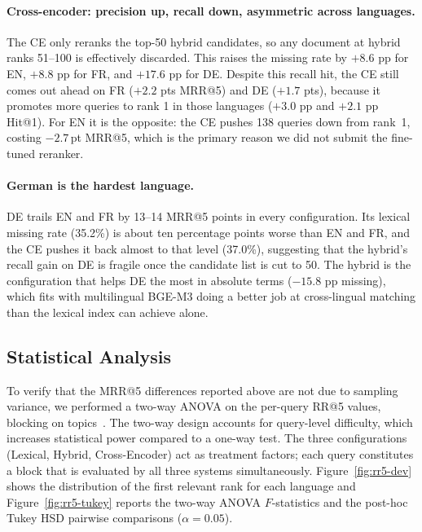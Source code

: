 \paragraph{Cross-encoder: precision up, recall down, asymmetric across languages.}
The CE only reranks the top-50 hybrid candidates, so any document at hybrid ranks 51--100 is effectively discarded. This raises the missing rate by $+8.6$ pp for EN, $+8.8$ pp for FR, and $+17.6$ pp for DE\@. Despite this recall hit, the CE still comes out ahead on FR ($+2.2$ pts MRR@5) and DE ($+1.7$ pts), because it promotes more queries to rank 1 in those languages ($+3.0$ pp and $+2.1$ pp Hit@1). For EN it is the opposite: the CE pushes 138 queries down from rank~1, costing $-2.7$\,pt MRR@5, which is the primary reason we did not submit the fine-tuned reranker.

\paragraph{German is the hardest language.}
DE trails EN and FR by 13--14 MRR@5 points in every configuration. Its lexical missing rate (35.2\%) is about ten percentage points worse than EN and FR, and the CE pushes it back almost to that level (37.0\%), suggesting that the hybrid's recall gain on DE is fragile once the candidate list is cut to 50. The hybrid is the configuration that helps DE the most in absolute terms ($-15.8$ pp missing), which fits with multilingual BGE-M3 doing a better job at cross-lingual matching than the lexical index can achieve alone.

\subsection{Statistical Analysis}
\label{subsec:res-stats}

To verify that the MRR@5 differences reported above are not due to sampling variance, we performed a two-way ANOVA on the per-query RR@5 values, blocking on topics~\citep{Sakai2016}. The two-way design accounts for query-level difficulty, which increases statistical power compared to a one-way test. The three configurations (Lexical, Hybrid, Cross-Encoder) act as treatment factors; each query constitutes a block that is evaluated by all three systems simultaneously. Figure~\ref{fig:rr5-dev} shows the distribution of the first relevant rank for each language and Figure~\ref{fig:rr5-tukey} reports the two-way ANOVA $F$-statistics and the post-hoc Tukey HSD pairwise comparisons ($\alpha = 0.05$).

